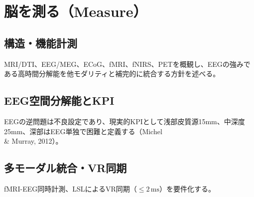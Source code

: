 \chapter{脳を測る（Measure）}
\label{chap:measure}
\section{構造・機能計測}
MRI/DTI、EEG/MEG、ECoG、fMRI、fNIRS、PETを概観し、EEGの強みである高時間分解能を他モダリティと補完的に統合する方針を述べる。

\section{EEG空間分解能とKPI}
EEGの逆問題は不良設定であり、現実的KPIとして浅部皮質源15mm、中深度25mm、深部はEEG単独で困難と定義する（Michel \\& Murray, 2012）。

\section{多モーダル統合・VR同期}
fMRI-EEG同時計測、LSLによるVR同期（\(\leq 2\,\mathrm{ms}\)）を要件化する。


